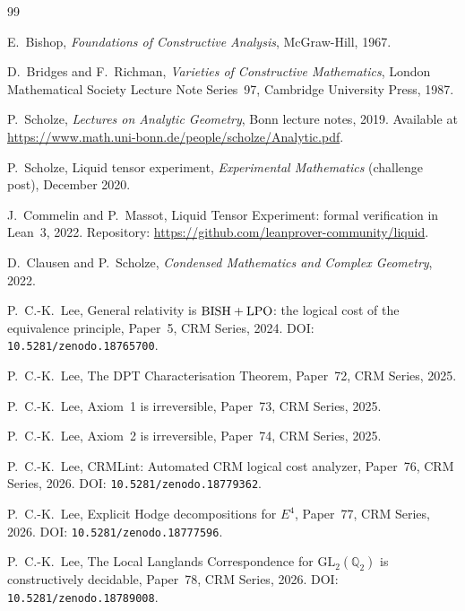 \documentclass[11pt,a4paper]{article}
\theoremstyle{plain}
\theoremstyle{definition}
\newcommand{\BISH}{\textup{BISH}}
\newcommand{\LPO}{\textup{LPO}}
\newcommand{\Q}{\mathbb{Q}}
\begin{document}
\begin{thebibliography}{99}

E.~Bishop,
\emph{Foundations of Constructive Analysis},
McGraw-Hill, 1967.

D.~Bridges and F.~Richman,
\emph{Varieties of Constructive Mathematics},
London Mathematical Society Lecture Note Series~97,
Cambridge University Press, 1987.

P.~Scholze,
\emph{Lectures on Analytic Geometry},
Bonn lecture notes, 2019.
Available at \url{https://www.math.uni-bonn.de/people/scholze/Analytic.pdf}.

P.~Scholze,
Liquid tensor experiment,
\emph{Experimental Mathematics} (challenge post), December 2020.

J.~Commelin and P.~Massot,
Liquid Tensor Experiment: formal verification in Lean~3,
2022.
Repository: \url{https://github.com/leanprover-community/liquid}.

D.~Clausen and P.~Scholze,
\emph{Condensed Mathematics and Complex Geometry},
2022.

P.~C.-K.~Lee,
General relativity is $\BISH + \LPO$: the logical cost of the
equivalence principle,
Paper~5, CRM Series, 2024.
DOI: \texttt{10.5281/zenodo.18765700}.

P.~C.-K.~Lee,
The DPT Characterisation Theorem,
Paper~72, CRM Series, 2025.

P.~C.-K.~Lee,
Axiom~1 is irreversible,
Paper~73, CRM Series, 2025.

P.~C.-K.~Lee,
Axiom~2 is irreversible,
Paper~74, CRM Series, 2025.

P.~C.-K.~Lee,
CRMLint: Automated CRM logical cost analyzer,
Paper~76, CRM Series, 2026.
DOI: \texttt{10.5281/zenodo.18779362}.

P.~C.-K.~Lee,
Explicit Hodge decompositions for $E^4$,
Paper~77, CRM Series, 2026.
DOI: \texttt{10.5281/zenodo.18777596}.

P.~C.-K.~Lee,
The Local Langlands Correspondence for $\mathrm{GL}_2(\Q_2)$
is constructively decidable,
Paper~78, CRM Series, 2026.
DOI: \texttt{10.5281/zenodo.18789008}.


\end{thebibliography}
\end{document}
